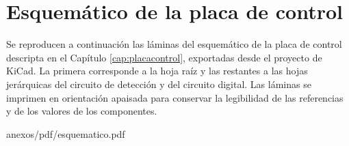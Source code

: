 \chapter{Esquemático de la placa de control}
\label{anexo:esquematico}

Se reproducen a continuación las láminas del esquemático de la placa de
control descripta en el Capítulo \ref{cap:placacontrol}, exportadas desde
el proyecto de KiCad. La primera corresponde a la hoja raíz y las
restantes a las hojas jerárquicas del circuito de detección y del
circuito digital. Las láminas se imprimen en orientación apaisada para
conservar la legibilidad de las referencias y de los valores de los
componentes.

\begin{hojaapaisada}
%
  {anexos/pdf/esquematico.pdf}
\end{hojaapaisada}
